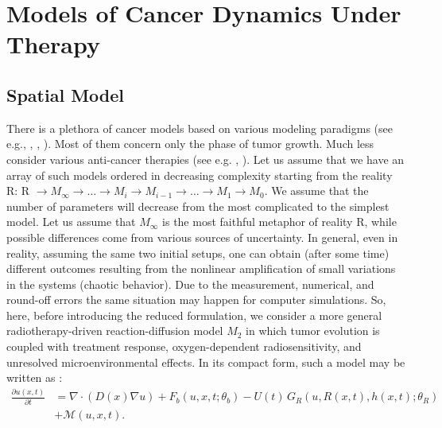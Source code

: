 
\section{Models of Cancer Dynamics Under Therapy}
\label{sec:models}
\subsection{Spatial Model}
There is a plethora of cancer models based on various modeling paradigms
(see e.g., \cite{cristini2010multiscale}, \cite{Sekyere2025VascularTumor}, \cite{wcislo20093}). Most of them concern only the
phase of tumor growth. Much less consider various anti-cancer therapies
(see e.g. \cite{Sujitha2023RadiotherapyBrainTumor}, \cite{dzwinel2021supermodeling}). Let us assume that we have an array of such
models ordered in decreasing complexity starting from the reality R: R
\(\rightarrow\)$M_{\infty} \to \ldots \to M_i \to M_{i-1} \to \ldots \to M_1 \to M_0$.
We assume that the number of parameters will decrease from the most
complicated to the simplest model. Let us assume that $M_{\infty}$
is the most faithful metaphor of reality R, while possible differences
come from various sources of uncertainty. In general, even in reality,
assuming the same two initial setups, one can obtain (after some time)
different outcomes resulting from the nonlinear amplification of small
variations in the systems (chaotic behavior). Due to the measurement,
numerical, and round-off errors the same situation may happen for
computer simulations. So, here, before introducing the reduced formulation, we consider a more
general radiotherapy-driven reaction-diffusion model $M_{2}$ in which tumor
evolution is coupled with treatment response, oxygen-dependent
radiosensitivity, and unresolved microenvironmental effects. In its
compact form, such a model may be written as \cite{Sujitha2023RadiotherapyBrainTumor}:
\begin{equation}
\label{eq:pde_general}
\begin{split}
    \frac{\partial u(x,t)}{\partial t}
&=
\nabla \cdot \left( D(x)\nabla u \right)
+
F_{b}(u,x,t;\theta_{b})
-
U(t)\,G_{R}(u,R(x,t),h(x,t);\theta_{R}) \\
&+
\mathcal{M}(u,x,t).
\end{split}
\end{equation}
